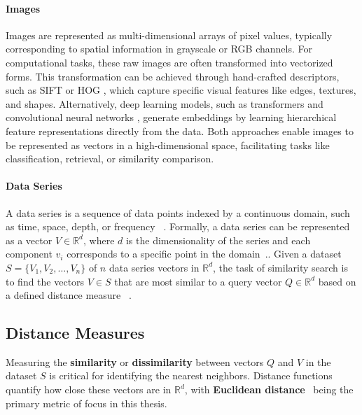 \paragraph{Images} 
Images are represented as multi-dimensional arrays of pixel values, typically corresponding to spatial information in grayscale or RGB channels. For computational tasks, these raw images are often transformed into vectorized forms. This transformation can be achieved through hand-crafted descriptors, such as SIFT \cite{Lowe2004} or HOG \cite{Dalal2005}, which capture specific visual features like edges, textures, and shapes. Alternatively, deep learning models, such as transformers \cite{transf,transf1,transf2,transf3, Vaswani2017} and convolutional neural networks \cite{LeCun1998, Krizhevsky2012,cnn,cnn1,cnn2}, generate embeddings by learning hierarchical feature representations directly from the data. Both approaches enable images to be represented as vectors in a high-dimensional space, facilitating tasks like classification, retrieval, or similarity comparison.

\paragraph{Data Series} 

A data series is a sequence of data points indexed by a continuous domain, such as time, space, depth, or frequency ~\cite{KostasThemisTalkICDE,conf/icde/echihabi2021,Lin2003, Keogh2005}. Formally, a data series can be represented as a vector \( V \in \mathbb{R}^d \), where \(d\) is the dimensionality of the series and each component \(v_i\) corresponds to a specific point in the domain~\cite{Shieh2009}.. Given a dataset \( S = \{V_1, V_2, \dots, V_n\} \) of \(n\) data series vectors in \( \mathbb{R}^d \), the task of similarity search is to find the vectors \(V \in S\) that are most similar to a query vector \( Q \in \mathbb{R}^d \) based on a defined distance measure~ \cite{conf/sigmod/echihabi2020,Palpanas2019,palpanas2015data,Faloutsos1994, Keogh2002}.

\subsection{Distance Measures}

Measuring the \textbf{similarity} or \textbf{dissimilarity} between vectors \(Q\) and \(V\) in the dataset \(S\) is critical for identifying the nearest neighbors. Distance functions quantify how close these vectors are in \(\mathbb{R}^d\), with \textbf{Euclidean distance}~\cite{euclid} being the primary metric of focus in this thesis.

